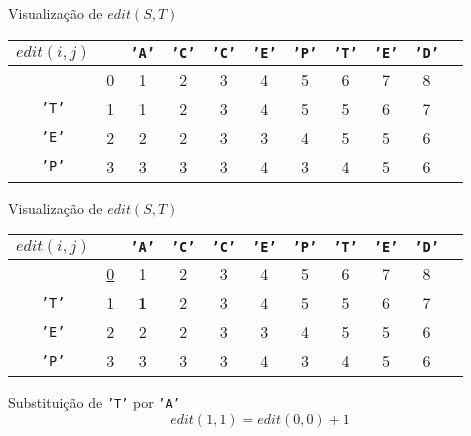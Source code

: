\begin{frame}[fragile]{Visualização de $edit(S,T)$}

    \begin{table}
        \centering

        \begin{tabular}{c|cccccccccc} $edit(i, j)$ &
        & \textcolor{red!80!black}{\texttt{'A'}}
        & \textcolor{red!80!black}{\texttt{'C'}}
        & \textcolor{red!80!black}{\texttt{'C'}}
        & \textcolor{red!80!black}{\texttt{'E'}}
        & \textcolor{red!80!black}{\texttt{'P'}}
        & \textcolor{red!80!black}{\texttt{'T'}}
        & \textcolor{red!80!black}{\texttt{'E'}}
        & \textcolor{red!80!black}{\texttt{'D'}}\\
        \hline
&0 &1&2&3&4&5&6&7&8\\
\textcolor{red!80!black}{\texttt{'T'}}
&1 &1&2&3&4&5&5&6&7\\
\textcolor{red!80!black}{\texttt{'E'}}
&2 &2&2&3&3&4&5&5&6\\
\textcolor{red!80!black}{\texttt{'P'}}
&3 &3&3&3&4&3&4&5&6\\
        \end{tabular}

    \end{table}

\end{frame}

\begin{frame}[fragile]{Visualização de $edit(S,T)$}

    \begin{table}
        \centering

        \begin{tabular}{c|cccccccccc} $edit(i, j)$ &
        & \textcolor{red!80!black}{\texttt{'A'}}
        & \textcolor{red!80!black}{\texttt{'C'}}
        & \textcolor{red!80!black}{\texttt{'C'}}
        & \textcolor{red!80!black}{\texttt{'E'}}
        & \textcolor{red!80!black}{\texttt{'P'}}
        & \textcolor{red!80!black}{\texttt{'T'}}
        & \textcolor{red!80!black}{\texttt{'E'}}
        & \textcolor{red!80!black}{\texttt{'D'}}\\
        \hline
&\underline{0} &1&2&3&4&5&6&7&8\\
\textcolor{red!80!black}{\texttt{'T'}}
&1 &\textbf{1}&2&3&4&5&5&6&7\\
\textcolor{red!80!black}{\texttt{'E'}}
&2 &2&2&3&3&4&5&5&6\\
\textcolor{red!80!black}{\texttt{'P'}}
&3 &3&3&3&4&3&4&5&6\\
        \end{tabular}

    \end{table}

    Substituição de 
\textcolor{red!80!black}{\texttt{'T'}}
    por
\textcolor{red!80!black}{\texttt{'A'}}
    \[
        edit(1, 1) = edit(0, 0) + 1
    \]    

\end{frame}

